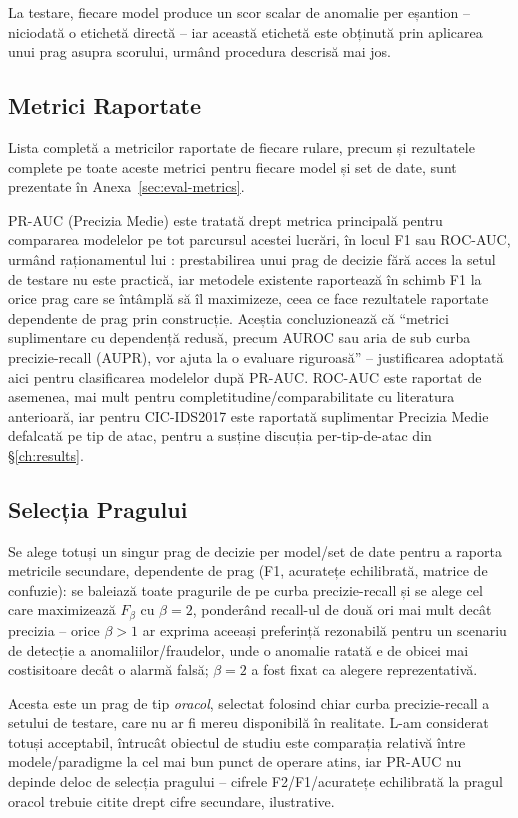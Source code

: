 La testare, fiecare model produce un scor scalar de anomalie per eșantion -- niciodată o etichetă directă -- iar această etichetă este obținută prin aplicarea unui prag asupra scorului, urmând procedura descrisă mai jos.

\subsection{Metrici Raportate}

Lista completă a metricilor raportate de fiecare rulare, precum și rezultatele complete pe toate aceste metrici pentru fiecare model și set de date, sunt prezentate în Anexa~\ref{sec:eval-metrics}.

PR-AUC (Precizia Medie) este tratată drept metrica principală pentru compararea modelelor pe tot parcursul acestei lucrări, în locul F1 sau ROC-AUC, urmând raționamentul lui \textcite{kim2022rigorous}: prestabilirea unui prag de decizie fără acces la setul de testare nu este practică, iar metodele existente raportează în schimb F1 la orice prag care se întâmplă să îl maximizeze, ceea ce face rezultatele raportate dependente de prag prin construcție. Aceștia concluzionează că \enquote{metrici suplimentare cu dependență redusă, precum AUROC sau aria de sub curba precizie-recall (AUPR), vor ajuta la o evaluare riguroasă} -- justificarea adoptată aici pentru clasificarea modelelor după PR-AUC. ROC-AUC este raportat de asemenea, mai mult pentru completitudine/comparabilitate cu literatura anterioară, iar pentru CIC-IDS2017 este raportată suplimentar Precizia Medie defalcată pe tip de atac, pentru a susține discuția per-tip-de-atac din \S\ref{ch:results}.

\subsection{Selecția Pragului}

Se alege totuși un singur prag de decizie per model/set de date pentru a raporta metricile secundare, dependente de prag (F1, acuratețe echilibrată, matrice de confuzie): se baleiază toate pragurile de pe curba precizie-recall și se alege cel care maximizează $F_\beta$ cu $\beta=2$, ponderând recall-ul de două ori mai mult decât precizia -- orice $\beta>1$ ar exprima aceeași preferință rezonabilă pentru un scenariu de detecție a anomaliilor/fraudelor, unde o anomalie ratată e de obicei mai costisitoare decât o alarmă falsă; $\beta=2$ a fost fixat ca alegere reprezentativă.

Acesta este un prag de tip \emph{oracol}, selectat folosind chiar curba precizie-recall a setului de testare, care nu ar fi mereu disponibilă în realitate. L-am considerat totuși acceptabil, întrucât obiectul de studiu este comparația relativă între modele/paradigme la cel mai bun punct de operare atins, iar PR-AUC nu depinde deloc de selecția pragului -- cifrele F2/F1/acuratețe echilibrată la pragul oracol trebuie citite drept cifre secundare, ilustrative.

